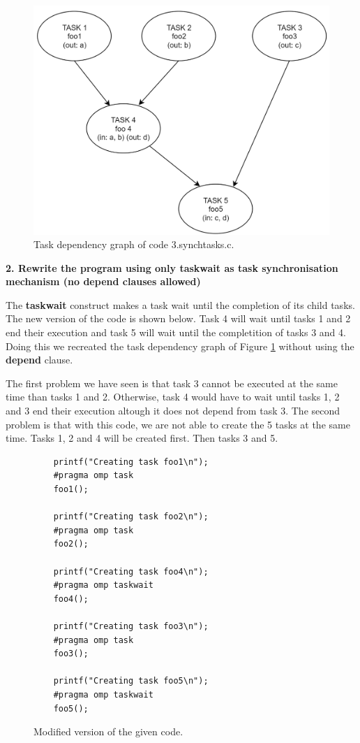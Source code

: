 \documentclass[12pt, a4paper]{article}
\begin{document}
\begin{figure}[H]
  \centering
  \includegraphics[scale=0.5]{./images/synchtasks}
  \caption{Task dependency graph of code 3.synchtasks.c.}
  \label{Task dependency graph of code 3.synchtasks.c.}
\end{figure}

\hfill

\textbf{2. Rewrite the program using only taskwait as task synchronisation mechanism (no depend clauses allowed)}

The \textbf{taskwait} construct makes a task wait until the completion of its child tasks. The new version of the code is shown below. Task 4 will wait until tasks 1 and 2 end their execution and task 5 will wait until the completition of tasks 3 and 4. Doing this we recreated the task dependency graph of Figure \ref{Task dependency graph of code 3.synchtasks.c.} without using the \textbf{depend} clause.

The first problem we have seen is that task 3 cannot be executed at the same time than tasks 1 and 2. Otherwise, task 4 would have to wait until tasks 1, 2 and 3 end their execution altough it does not depend from task 3. The second problem is that with this code, we are not able to create the 5 tasks at the same time. Tasks 1, 2 and 4 will be created first. Then tasks 3 and 5.

\begin{figure}[H]
	\begin{lstlisting}
	printf("Creating task foo1\n");
	#pragma omp task
	foo1();
	
	printf("Creating task foo2\n");
	#pragma omp task
	foo2();
	
	printf("Creating task foo4\n");
	#pragma omp taskwait
	foo4();

	printf("Creating task foo3\n");
	#pragma omp task
	foo3();
	
	printf("Creating task foo5\n");
	#pragma omp taskwait
	foo5();
	\end{lstlisting}
	
	\caption{Modified version of the given code.}
\end{figure}
\end{document}
